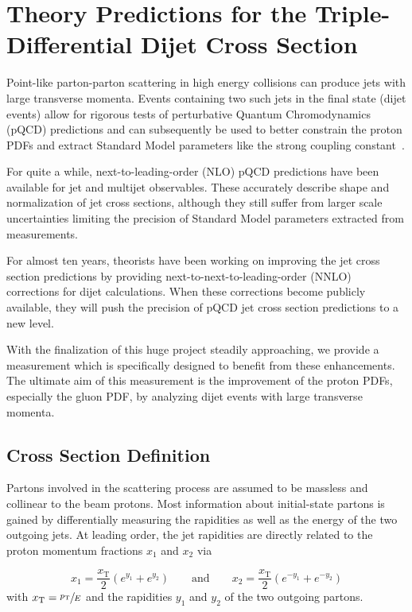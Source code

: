 
\chapter{Theory Predictions for the Triple-Differential Dijet Cross Section}
\label{sec:theory_predictions}

Point-like parton-parton scattering in high energy collisions can produce
jets with large transverse momenta. Events containing two such jets  in the
final state (dijet events) allow for rigorous tests of perturbative Quantum
Chromodynamics (pQCD) predictions and can subsequently be used to better
constrain the proton PDFs and extract Standard Model parameters like the strong
coupling constant~\as.

For quite a while, next-to-leading-order (NLO) pQCD predictions have been available
for jet and multijet observables. These accurately describe shape and
normalization of jet cross sections, although they still suffer from larger scale
uncertainties limiting the precision of Standard Model parameters extracted from
measurements.

For almost ten years, theorists have been working on improving the jet cross
section predictions by providing next-to-next-to-leading-order (NNLO) corrections for
dijet calculations. When these corrections become publicly available, they will
push the precision of pQCD jet cross section predictions to a new level.

With the finalization of this huge project steadily approaching, we provide a
measurement which is specifically designed to benefit from these enhancements.
The ultimate aim of this measurement is the improvement of the proton PDFs,
especially the gluon PDF, by analyzing dijet events with large transverse momenta.

\section{Cross Section Definition}

Partons involved in the scattering process are assumed to be massless and
collinear to the beam protons. Most information about initial-state partons
is gained by differentially measuring the rapidities as well as the energy of
the two outgoing jets. At leading order, the jet rapidities are directly
related to the proton momentum fractions $x_1$ and $x_2$ via

\begin{equation*}
    x_1 = \frac{x_\mathrm{T}}{2} \left( e^{y_1} + e^{y_2} \right)
    \qquad\text{and}\qquad x_2 = \frac{x_\mathrm{T}}{2} \left( e^{-y_1} +
    e^{-y_2} \right)
\end{equation*}
with $x_{\mathrm{T}} = \sfrac{p_{\mathrm{T}}}{E}$ and the rapidities $y_1$ and $y_2$ of the two outgoing
partons.

